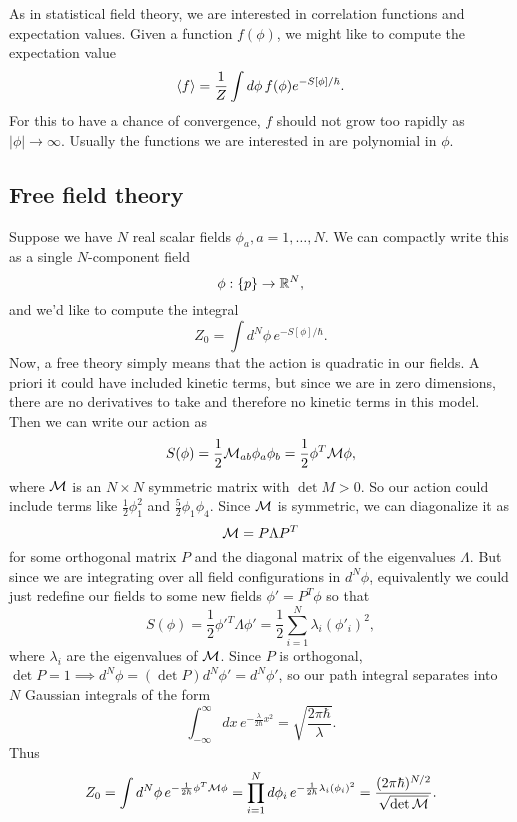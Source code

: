 As in statistical field theory, we are interested in correlation functions and expectation values. Given a function $f(\phi)$, we might like to compute the expectation value
\begin{equation}
    \left< f \right>=\frac{1}{Z} \int d\phi \, f(\phi)e^{-S[\phi]/\hbar}.
\end{equation}
For this to have a chance of convergence, $f$ should not grow too rapidly as $|\phi| \to \infty$. Usually the functions we are interested in are polynomial in $\phi$.

\subsection*{Free field theory}
Suppose we have $N$ real scalar fields $\phi_a, a=1,\ldots, N$. We can compactly write this as a single $N$-component field
\begin{equation}
    \phi: \{p\}\to \mathbb{R}^N,
\end{equation}
and we'd like to compute the integral
\begin{equation}
    Z_0 = \int d^N \phi\, e^{-S[\phi]/\hbar}.
\end{equation}
Now, a free theory simply means that the action is quadratic in our fields. A priori it could have included kinetic terms, but since we are in zero dimensions, there are no derivatives to take and therefore no kinetic terms in this model. Then we can write our action as
\begin{equation}
    S(\phi)=\frac{1}{2} \mathcal{M}_{ab} \phi_a \phi_b =\frac{1}{2} \phi^T \mathcal{M} \phi,
\end{equation}
where $\mathcal{M}$ is an $N\times N$ symmetric matrix with $\det M > 0$. So our action could include terms like $\frac{1}{2}\phi_1^2$ and $\frac{5}{2} \phi_1 \phi_4$. Since $\mathcal{M}$ is symmetric, we can diagonalize it as
\begin{equation*}
    \mathcal{M}=P\Lambda P^T
\end{equation*}
for some orthogonal matrix $P$ and the diagonal matrix of the eigenvalues $\Lambda$. But since we are integrating over all field configurations in $d^N\phi$, equivalently we could just redefine our fields to some new fields $\phi'= P^T  \phi$ so that 
\begin{equation*}
    S(\phi)= \frac{1}{2} \phi'{}^T \Lambda \phi'= \frac{1}{2} \sum_{i=1}^N \lambda_i (\phi'_i)^2,
\end{equation*}
where $\lambda_i$ are the eigenvalues of $\mathcal{M}$. Since $P$ is orthogonal, $\det P = 1 \implies d^N \phi=(\det P)d^N \phi' = d^N \phi'$, so our path integral separates into $N$ Gaussian integrals of the form
\begin{equation}
    \int_{-\infty}^\infty dx\, e^{-\frac{\lambda}{2\hbar}x^2}=\sqrt{\frac{2\pi \hbar}{\lambda}}.
\end{equation}
Thus
\begin{equation}
    Z_0 = \int d^N \phi \, e^{-\frac{1}{2\hbar}\phi^T \mathcal{M} \phi}= \prod_{i=1}^N d \phi_i \, e^{-\frac{1}{2\hbar} \lambda_i (\phi_i)^2} = \frac{(2\pi \hbar)^{N/2}}{\sqrt{\det \mathcal{M}}}.
\end{equation}

